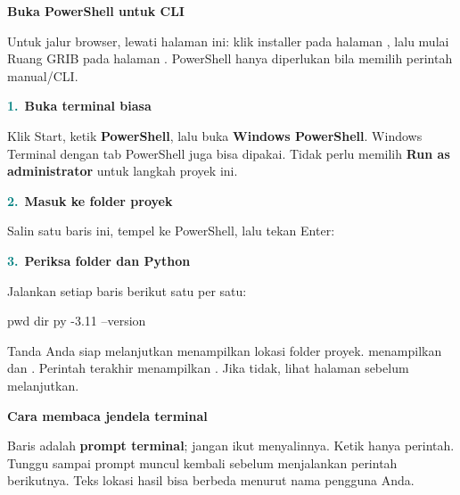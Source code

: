\documentclass[11pt,a4paper]{article}
\newcommand{\step}[2]{\par\addvspace{2mm}\noindent\textcolor{teal}{\textbf{#1.}}\ \textbf{#2}\par\nobreak}
\newcommand{\pagetitle}[3]{\clearpage{\color{teal}\small\bfseries LANGKAH #1}\par{\color{slate}\LARGE\bfseries #2}\par\vspace{2mm}#3\par\vspace{3mm}}
\begin{document}
\pagetitle{3 (opsional)}{Buka PowerShell untuk CLI}{Untuk jalur browser, lewati halaman ini: klik installer pada halaman \pageref{pg:packages}, lalu mulai Ruang GRIB pada halaman \pageref{pg:web-start}. PowerShell hanya diperlukan bila memilih perintah manual/CLI.}
\label{pg:powershell}
\step{1}{Buka terminal biasa}
Klik Start, ketik \textbf{PowerShell}, lalu buka \textbf{Windows PowerShell}.
Windows Terminal dengan tab PowerShell juga bisa dipakai. Tidak perlu memilih
\textbf{Run as administrator} untuk langkah proyek ini.
\step{2}{Masuk ke folder proyek}
Salin satu baris ini, tempel ke PowerShell, lalu tekan Enter:
\step{3}{Periksa folder dan Python}
Jalankan setiap baris berikut satu per satu:
\begin{terminal}
pwd
dir
py -3.11 --version
\end{terminal}
\begin{panel}{Tanda Anda siap melanjutkan}
 menampilkan lokasi folder proyek.  menampilkan
 dan . Perintah terakhir menampilkan
. Jika tidak, lihat halaman \pageref{pg:troubleshooting} sebelum melanjutkan.
\end{panel}
\textbf{Cara membaca jendela terminal}\par
\par\noindent{}\par
Baris  adalah \textbf{prompt terminal}; jangan ikut menyalinnya.
Ketik hanya perintah. Tunggu sampai prompt muncul kembali sebelum menjalankan
perintah berikutnya. Teks lokasi hasil bisa berbeda menurut nama pengguna Anda.
\end{document}
